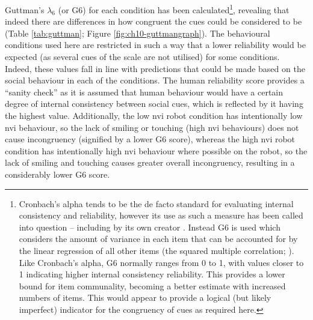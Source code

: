 Guttman's $\lambda _{6}$ (or G6) for each condition has been calculated\footnote{Cronbach's alpha tends to be the de facto standard for evaluating internal consistency and reliability, however its use as such a measure has been called into question \citep{revelle2009coefficients} -- including by its own creator \citep{cronbach2004my}. Instead G6 is used which considers the amount of variance in each item that can be accounted for by the linear regression of all other items (the squared multiple correlation; \citealp{guttman1945basis}). Like Cronbach's alpha, G6 normally ranges from 0 to 1, with values closer to 1 indicating higher internal consistency reliability. This provides a lower bound for item communality, becoming a better estimate with increased numbers of items. This would appear to provide a logical (but likely imperfect) indicator for the congruency of cues as required here.}, revealing that indeed there are differences in how congruent the cues could be considered to be (Table \ref{tab:guttman}; Figure \ref{fig:ch10-guttmangraph}). The behavioural conditions used here are restricted in such a way that a lower reliability would be expected (as several cues of the scale are not utilised) for some conditions. Indeed, these values fall in line with predictions that could be made based on the social behaviour in each of the conditions. The human reliability score provides a ``sanity check'' as it is assumed that human behaviour would have a certain degree of internal consistency between social cues, which is reflected by it having the highest value. Additionally, the low \acrshort{nvi} robot condition has intentionally low \acrshort{nvi} behaviour, so the lack of smiling or touching (high \acrshort{nvi} behaviours) does not cause incongruency (signified by a lower G6 score), whereas the high \acrshort{nvi} robot condition has intentionally high \acrshort{nvi} behaviour where possible on the robot, so the lack of smiling and touching causes greater overall incongruency, resulting in a considerably lower G6 score.


